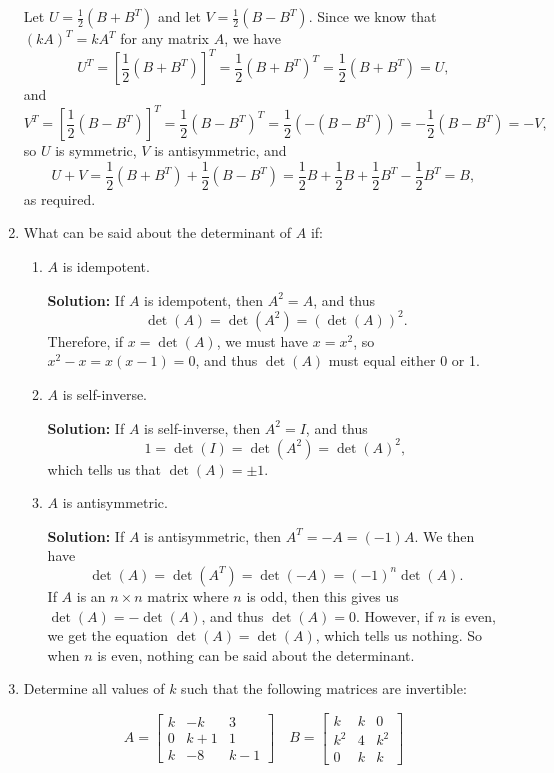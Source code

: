 \documentclass[letterpaper,12pt,reqno]{amsart}
\newcommand{\bbm}{\begin{bmatrix}}
\newcommand{\ebm}{\end{bmatrix}}
\begin{document}
\begin{enumerate}
\bigskip

Let $U = \frac{1}{2}(B+B^T)$ and let $V = \frac{1}{2}(B-B^T)$. Since we know that $(kA)^T = kA^T$ for any matrix $A$, we have
\[
 U^T = \left[\frac{1}{2}(B+B^T)\right]^T = \frac{1}{2}(B+B^T)^T = \frac{1}{2}(B+B^T) = U,
\]
and
\[
 V^T = \left[\frac{1}{2}(B-B^T)\right]^T = \frac{1}{2}(B-B^T)^T = \frac{1}{2}(-(B-B^T)) = -\frac{1}{2}(B-B^T) = -V,
\]
so $U$ is symmetric, $V$ is antisymmetric, and
\[
 U+V = \frac{1}{2}(B+B^T)+\frac{1}{2}(B-B^T) = \frac{1}{2}B+\frac{1}{2}B+\frac{1}{2}B^T-\frac{1}{2}B^T = B,
\]
as required.

\bigskip

\item What can be said about the determinant of $A$ if:

\medskip

\begin{enumerate}
 \item $A$ is idempotent.

\bigskip

{\bf Solution:} If $A$ is idempotent, then $A^2 = A$, and thus
\[
 \det(A) = \det(A^2) = (\det(A))^2.
\]
Therefore, if $x=\det(A)$, we must have $x=x^2$, so $x^2-x = x(x-1)=0$, and thus $\det(A)$ must equal either 0 or 1.

\bigskip

 \item $A$ is self-inverse.

\bigskip

{\bf Solution:} If $A$ is self-inverse, then $A^2=I$, and thus
\[
 1 = \det(I) = \det(A^2) = \det(A)^2,
\]
which tells us that $\det(A) = \pm 1$.

\bigskip

 \item $A$ is antisymmetric.  

\bigskip

{\bf Solution:} If $A$ is antisymmetric, then $A^T = -A = (-1)A$. We then have
\[
 \det(A) = \det(A^T) = \det(-A) = (-1)^n\det(A).
\]
If $A$ is an $n\times n$ matrix where $n$ is odd, then this gives us $\det(A) = -\det(A)$, and thus $\det(A)=0$. However, if $n$ is even, we get the equation $\det(A)=\det(A)$, which tells us nothing. So when $n$ is even, nothing can be said about the determinant.
\end{enumerate}

\bigskip

\item Determine all values of $k$ such that the following matrices are invertible:

\medskip

\[
 A = \bbm k&-k&3\\0&k+1&1\\k&-8&k-1\ebm \quad B = \bbm k&k&0\\k^2&4&k^2\\0&k&k\ebm
\]

\end{enumerate}
\end{document}
